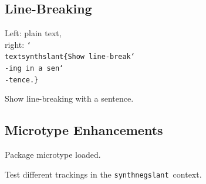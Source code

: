\documentclass[a4paper]{article}
\newcommand*{\code}[1]{\texttt{#1}}
\newcommand*{\cs}[1]{\texttt{\char`\\#1}}
\newcommand*{\packagename}[1]{\mbox{\textsf{#1}}}
\begin{document}
\subsection{Line-Breaking}

Left: plain text,  \\
right: \code{\cs{textsynthslant}\{Show line-break\cs{-}ing in a sen\cs{-}tence.\}}

\begin{center}
  \setlength{\overfullrule}{0pt}
  \begin{minipage}[t]{0pt}Show line-breaking with a sentence.\end{minipage}%
  \hspace*{100pt}%
  \begin{minipage}[t]{0pt}\end{minipage}
\end{center}

\subsection{Microtype Enhancements}

\ifdefined\SetTracking
  Package \packagename{microtype} loaded.

  Test different trackings in the \code{synthnegslant}~context.
\end{document}

